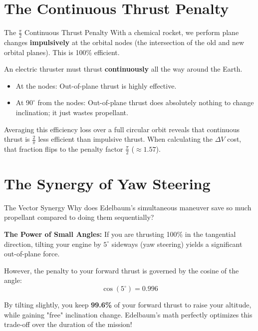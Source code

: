 \documentclass[11pt]{beamer}
\begin{document}
\section{The Continuous Thrust Penalty}

\begin{frame}{The $\frac{\pi}{2}$ Continuous Thrust Penalty}
    With a chemical rocket, we perform plane changes \textbf{impulsively} at the orbital nodes (the intersection of the old and new orbital planes). This is 100\% efficient.
    
    \vspace{0.3cm}
    An electric thruster must thrust \textbf{continuously} all the way around the Earth.
    \begin{itemize}
        \item At the nodes: Out-of-plane thrust is highly effective.
        \item At $90^\circ$ from the nodes: Out-of-plane thrust does absolutely nothing to change inclination; it just wastes propellant.
    \end{itemize}
    
    \vspace{0.3cm}
    Averaging this efficiency loss over a full circular orbit reveals that continuous thrust is $\frac{2}{\pi}$ less efficient than impulsive thrust. When calculating the $\Delta V$ cost, that fraction flips to the penalty factor $\frac{\pi}{2}$ ($\approx 1.57$).
\end{frame}

\section{The Synergy of Yaw Steering}

\begin{frame}{The Vector Synergy}
    Why does Edelbaum's simultaneous maneuver save so much propellant compared to doing them sequentially?
    
    \vspace{0.3cm}
    \textbf{The Power of Small Angles:}
    If you are thrusting 100\% in the tangential direction, tilting your engine by $5^\circ$ sideways (yaw steering) yields a significant out-of-plane force.
    
    \vspace{0.3cm}
    However, the penalty to your forward thrust is governed by the cosine of the angle:
    \begin{equation}
        \cos(5^\circ) = 0.996
    \end{equation}
    
    \vspace{0.3cm}
    By tilting slightly, you keep \textbf{99.6\%} of your forward thrust to raise your altitude, while gaining "free" inclination change. Edelbaum's math perfectly optimizes this trade-off over the duration of the mission!
\end{frame}
\end{document}
